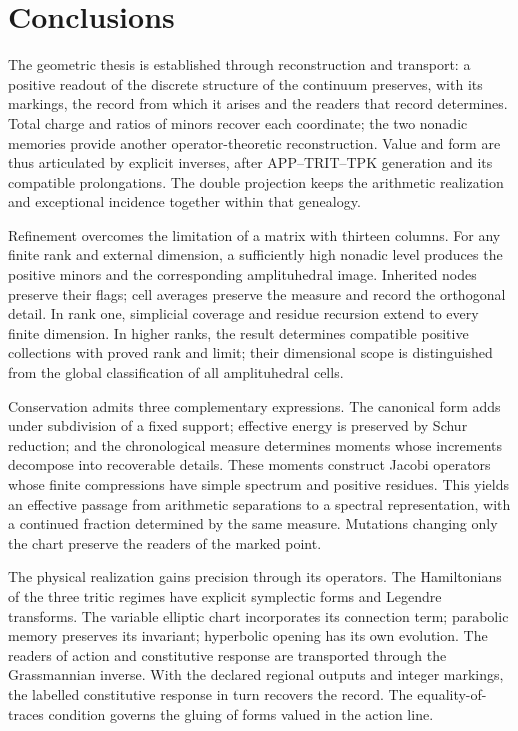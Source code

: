 \clearpage
\section{Conclusions}
\label{sec:conclusions-final}
\begingroup
\fontsize{10.2}{12.8}\selectfont
\setlength{\parskip}{3pt plus .5pt}

The geometric thesis is established through reconstruction and transport:
a positive readout of the discrete structure of the continuum preserves,
with its markings, the record from which it arises and the readers that
record determines. Total charge and ratios of minors recover each
coordinate; the two nonadic memories provide another operator-theoretic
reconstruction. Value and form are thus articulated by explicit inverses,
after APP--TRIT--TPK generation and its compatible prolongations.
The double projection keeps the arithmetic realization and
exceptional incidence together within that genealogy.

Refinement overcomes the limitation of a matrix with thirteen columns.
For any finite rank and external dimension, a sufficiently high nonadic
level produces the positive minors and the corresponding amplituhedral
image. Inherited nodes preserve their flags; cell
averages preserve the measure and record the orthogonal
detail. In rank one, simplicial coverage and residue recursion
extend to every finite dimension. In higher ranks,
the result determines compatible positive collections with proved rank and
limit; their dimensional scope is distinguished from the
global classification of all amplituhedral cells.

Conservation admits three complementary expressions. The canonical
form adds under subdivision of a fixed support; effective
energy is preserved by Schur reduction; and the chronological
measure determines moments whose increments decompose into
recoverable details. These moments construct Jacobi
operators whose finite compressions have simple spectrum and positive residues. This yields
an effective passage from arithmetic separations to a
spectral representation, with a continued fraction determined by the
same measure. Mutations changing only the chart
preserve the readers of the marked point.

The physical realization gains precision through its operators. The
Hamiltonians of the three tritic regimes have explicit
symplectic forms and Legendre transforms. The variable
elliptic chart incorporates its connection term; parabolic
memory preserves its invariant; hyperbolic opening has
its own evolution. The readers of action and constitutive
response are transported through the Grassmannian inverse. With
the declared regional outputs and integer markings,
the labelled constitutive response in turn recovers the record.
The equality-of-traces condition governs the gluing of forms
valued in the action line.

